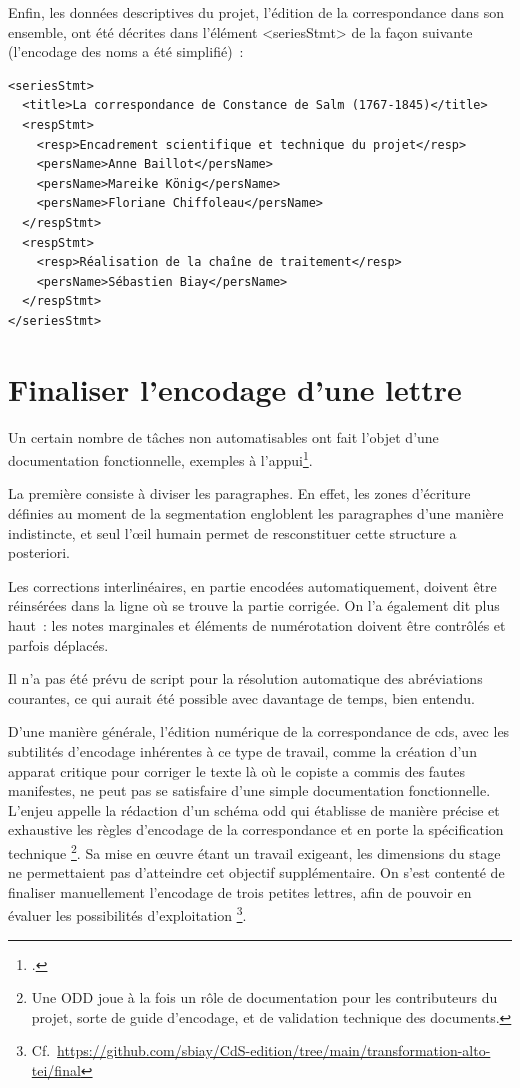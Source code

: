 \documentclass[a4paper,12pt,twoside]{book}
\begin{document}
				Enfin, les données descriptives du projet, l'édition de la correspondance dans son ensemble, ont été décrites dans l'élément \textsf{<seriesStmt>} de la façon suivante (l'encodage des noms a été simplifié)~:
				
				\small
				\begin{verbatim}
<seriesStmt>
  <title>La correspondance de Constance de Salm (1767-1845)</title>
  <respStmt>
    <resp>Encadrement scientifique et technique du projet</resp>
    <persName>Anne Baillot</persName>
    <persName>Mareike König</persName>
    <persName>Floriane Chiffoleau</persName>
  </respStmt>
  <respStmt>
    <resp>Réalisation de la chaîne de traitement</resp>
    <persName>Sébastien Biay</persName>
  </respStmt>
</seriesStmt>
				\end{verbatim}
				\normalsize

		\section{Finaliser l'encodage d'une lettre}
		
			Un certain nombre de tâches non automatisables ont fait l'objet d'une documentation fonctionnelle, exemples à l'appui\footcite{biayFinaliserEncodageLettre2022}.
			
			La première consiste à diviser les paragraphes. En effet, les zones d'écriture définies au moment de la \gls{segmentation} engloblent les paragraphes d'une manière indistincte, et seul l'œil humain permet de resconstituer cette structure a posteriori.
			
			Les corrections interlinéaires, en partie encodées automatiquement, doivent être réinsérées dans la ligne où se trouve la partie corrigée. On l'a également dit plus haut~: les notes marginales et éléments de numérotation doivent être contrôlés et parfois déplacés.
			
			Il n'a pas été prévu de script pour la résolution automatique des abréviations courantes, ce qui aurait été possible avec davantage de temps, bien entendu.
			
			D'une manière générale, l'édition numérique de la correspondance de \gls{cds}, avec les subtilités d'encodage inhérentes à ce type de travail, comme la création d'un apparat critique pour corriger le texte là où le copiste a commis des fautes manifestes, ne peut pas se satisfaire d'une simple documentation fonctionnelle. L'enjeu appelle la rédaction d'un schéma \gls{odd} qui établisse de manière précise et exhaustive les règles d'encodage de la correspondance et en porte la spécification technique%
			\footnote{Une ODD joue à la fois un rôle de documentation pour les contributeurs du projet, sorte de guide d'encodage, et de validation technique des documents.}.
			Sa mise en œuvre étant un travail exigeant, les dimensions du stage ne permettaient pas d'atteindre cet objectif supplémentaire. On s'est contenté de finaliser manuellement l'encodage de trois petites lettres, afin de pouvoir en évaluer les possibilités d'exploitation%
			\footnote{Cf.~\url{https://github.com/sbiay/CdS-edition/tree/main/transformation-alto-tei/final}}.
		
\end{document}
